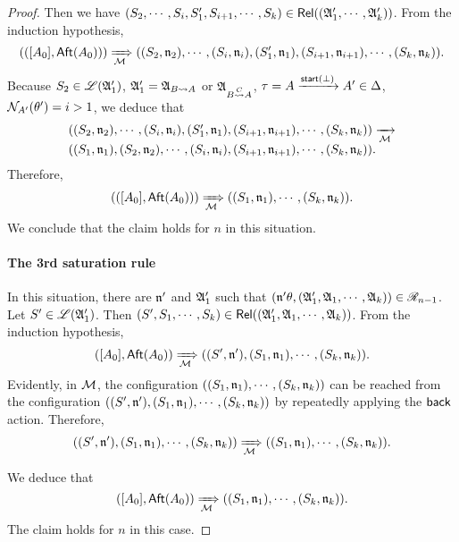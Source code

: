 \begin{proof}
Then we have  $(S_2, \cdots, S_i, S'_1, S_{i+1}, \cdots, S_k) \in \mathsf{Rel}(({\mathfrak{A} }'_1, \cdots, {\mathfrak{A} }'_k))$.
From the induction hypothesis, 
$$(([A_0], {\sf Aft}(A_0))) \xRightarrow[{\mathcal{M} }]{} ((S_2, \mathfrak{n}_2), \cdots, (S_i, \mathfrak{n}_i), (S'_1, \mathfrak{n}_1), (S_{i+1}, \mathfrak{n}_{i+1}), \cdots, (S_k, \mathfrak{n}_k)).$$ 
%
Because $S_2 \in {\mathscr{L} }({\mathfrak{A} }'_1)$, ${\mathfrak{A} }'_1 = {\mathfrak{A} }_{B \rightsquigarrow A}$ or ${\mathfrak{A} }_{B \stackrel{C}{\rightsquigarrow} A}$, $\tau = A \xrightarrow{{\mathsf{start} }(\bot)} A'  \in \Delta$, $\mathcal{N}_{A'}(\theta') = i > 1$, we deduce that 
$$
\begin{array}{l}
((S_2, \mathfrak{n}_2), \cdots, (S_i, \mathfrak{n}_i), (S'_1, \mathfrak{n}_1), (S_{i+1}, \mathfrak{n}_{i+1}), \cdots, (S_k, \mathfrak{n}_k)) \xrightarrow[{\mathcal{M} }]{} \\
((S_1, \mathfrak{n}_1), (S_2, \mathfrak{n}_2), \cdots, (S_i, \mathfrak{n}_i), (S_{i+1}, \mathfrak{n}_{i+1}), \cdots, (S_k, \mathfrak{n}_k)).
\end{array}
$$
Therefore, 
$$
\begin{array}{l}
(([A_0], {\sf Aft}(A_0))) \xRightarrow[{\mathcal{M} }]{} ((S_1, \mathfrak{n}_1), \cdots, (S_k, \mathfrak{n}_k)).
\end{array}
$$
We conclude that the claim holds for $n$ in this situation.

\paragraph*{The 3rd saturation rule} In this situation, there are $\mathfrak{n}'$ and ${\mathfrak{A} }'_1$ such that $(\mathfrak{n}' \theta, ({\mathfrak{A} }'_1, {\mathfrak{A} }_1, \cdots, {\mathfrak{A} }_k)) \in \mathscr{R}_{n-1}$.
Let $S' \in {\mathscr{L} }({\mathfrak{A} }'_1)$. Then $(S', S_1, \cdots, S_k) \in \mathsf{Rel}(({\mathfrak{A} }'_1, {\mathfrak{A} }_1, \cdots, {\mathfrak{A} }_k))$. From the induction hypothesis, 
\[([A_0], {\sf Aft}(A_0)) \xRightarrow[{\mathcal{M} }]{} ((S', \mathfrak{n}'), (S_1, \mathfrak{n}_1), \cdots, (S_k, \mathfrak{n}_k)). \]
Evidently, in ${\mathcal{M} }$, the configuration $((S_1, \mathfrak{n}_1), \cdots, (S_k, \mathfrak{n}_k))$ can be reached from the configuration $((S', \mathfrak{n}'), (S_1, \mathfrak{n}_1), \cdots, (S_k, \mathfrak{n}_k))$ by repeatedly applying the ${\mathsf{back} }$ action. Therefore, 
\[ ((S', \mathfrak{n}'), (S_1, \mathfrak{n}_1), \cdots, (S_k, \mathfrak{n}_k))  \xRightarrow[{\mathcal{M} }]{} ((S_1, \mathfrak{n}_1), \cdots, (S_k, \mathfrak{n}_k)). \]

We deduce that 
 \[([A_0], {\sf Aft}(A_0)) \xRightarrow[{\mathcal{M} }]{} ((S_1, \mathfrak{n}_1), \cdots, (S_k, \mathfrak{n}_k)). \]
 The claim holds for $n$ in this case. 
 

\end{proof}
